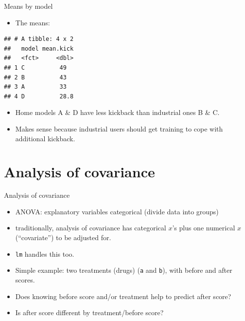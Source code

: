 \documentclass[ignorenonframetext,]{beamer}
\newenvironment{Shaded}{\begin{snugshade}}{\end{snugshade}}
\newcommand{\DataTypeTok}[1]{\textcolor[rgb]{0.13,0.29,0.53}{#1}}
\newcommand{\KeywordTok}[1]{\textcolor[rgb]{0.13,0.29,0.53}{\textbf{#1}}}
\newcommand{\NormalTok}[1]{#1}
\newcommand{\OperatorTok}[1]{\textcolor[rgb]{0.81,0.36,0.00}{\textbf{#1}}}
\newcommand{\StringTok}[1]{\textcolor[rgb]{0.31,0.60,0.02}{#1}}
\providecommand{\tightlist}{%
  \setlength{\itemsep}{0pt}\setlength{\parskip}{0pt}}
\begin{document}
\begin{frame}[fragile]{Means by model}
\protect\hypertarget{means-by-model}{}

\begin{itemize}
\tightlist
\item
  The means:
\end{itemize}

\begin{Shaded}
\end{Shaded}

\begin{verbatim}
## # A tibble: 4 x 2
##   model mean.kick
##   <fct>     <dbl>
## 1 C          49  
## 2 B          43  
## 3 A          33  
## 4 D          28.8
\end{verbatim}

\begin{itemize}
\item
  Home models A \& D have less kickback than industrial ones B \& C.
\item
  Makes sense because industrial users should get training to cope with
  additional kickback.
\end{itemize}

\section{Analysis of covariance}
\frame{\sectionpage}

\end{frame}

\begin{frame}[fragile]{Analysis of covariance}
\protect\hypertarget{analysis-of-covariance}{}

\begin{itemize}
\item
  ANOVA: explanatory variables categorical (divide data into groups)
\item
  traditionally, analysis of covariance has categorical \(x\)'s plus one
  numerical \(x\) (``covariate'') to be adjusted for.
\item
  \texttt{lm} handles this too.
\item
  Simple example: two treatments (drugs) (\texttt{a} and \texttt{b}),
  with before and after scores.
\item
  Does knowing before score and/or treatment help to predict after
  score?
\item
  Is after score different by treatment/before score?
\end{itemize}

\end{frame}
\end{document}
